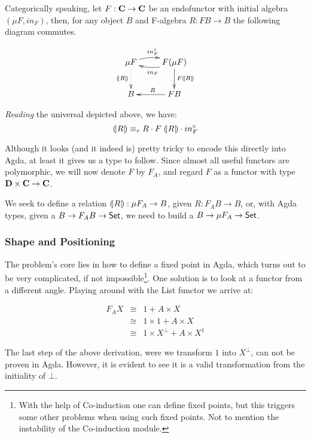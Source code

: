 Categorically speaking, let $F : \textbf{C} \rightarrow \textbf{C}$ be an endofunctor with
initial algebra $(\mu F , in_F)$, then, for any object $B$ and F-algebra $R : F B \rightarrow B$
the following diagram commutes.

\begin{displaymath}
\xymatrix{%
  \mu F \ar@/^/[r]^{in_F^\circ} \ar@{..>}[d]_{\scata{R}}
     & F (\mu F) \ar@/^/[l]^{in_F} \ar[d]^{F \scata{R}} \\
  B     & \ar[l]_{R} F B
}
\end{displaymath}

\emph{Reading} the universal depicted above, we have:
\[ \mathopen{(\!|}R\mathclose{|\!)} \equiv_r R \cdot F\;\mathopen{(\!|}R\mathclose{|\!)} \cdot in_F^\circ \]

Although it looks (and it indeed is) pretty tricky to encode this directly into Agda, at least it gives
us a type to follow. Since almost all useful functors are polymorphic, we will now
denote $F$ by $F_A$, and regard $F$ as a functor with type $\textbf{D} \times \textbf{C} \rightarrow \textbf{C}$.

We seek to define a relation $\mathopen{(\!|}R\mathclose{|\!)} : \mu F_A \rightarrow B$, given $R : F_A B \rightarrow B$,
or, with Agda types, given a $B \rightarrow F_A B \rightarrow \D{Set}$, we need to build a $B \rightarrow \mu F_A \rightarrow \D{Set}$.

\subsubsection{Shape and Positioning}

The problem's core lies in how to define a fixed point in Agda, which turns out 
to be very complicated, if not impossible\footnote{%
With the help of Co-induction one can define fixed points, but this triggers some other
problems when using such fixed points. Not to mention the instability of the Co-induction module.
}. One solution is to look at a functor from a different angle. Playing around with
the List functor we arrive at:

\begin{eqnarray*}
  F_A X & \cong & 1 + A \times X \\
        & \cong & 1 \times 1 + A \times X \\
        & \cong & 1 \times X^\bot + A \times X^1
\end{eqnarray*}

The last step of the above derivation, were we transform $1$ into $X^\bot$, can not be proven
in Agda. However, it is evident to see it is a valid transformation from the initiality of $\bot$.

